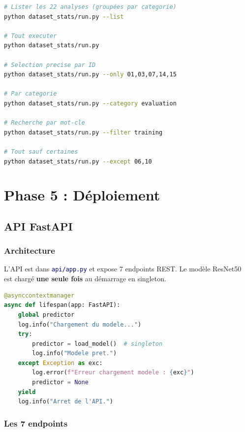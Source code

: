 \documentclass[11pt,a4paper,oneside]{report}
\newcommand{\code}[1]{\texttt{\textcolor{navy}{#1}}}
\begin{document}
\begin{lstlisting}[language=Bash, caption={Exemples d'utilisation}]
# Lister les 22 analyses (groupées par categorie)
python dataset_stats/run.py --list

# Tout executer
python dataset_stats/run.py

# Selection precise par ID
python dataset_stats/run.py --only 01,03,07,14,15

# Par categorie
python dataset_stats/run.py --category evaluation

# Recherche par mot-cle
python dataset_stats/run.py --filter training

# Tout sauf certaines
python dataset_stats/run.py --except 06,10
\end{lstlisting}

\chapter{Phase 5 : Déploiement}

\section{API FastAPI}

\subsection{Architecture}

L'API est dans \code{api/app.py} et expose 7 endpoints REST. Le modèle ResNet50 est chargé \textbf{une seule fois} au démarrage en singleton.

\begin{lstlisting}[language=Python, caption={Lifecycle de l'API}]
@asynccontextmanager
async def lifespan(app: FastAPI):
    global predictor
    log.info("Chargement du modele...")
    try:
        predictor = load_model()  # singleton
        log.info("Modele pret.")
    except Exception as exc:
        log.error(f"Erreur chargement modele : {exc}")
        predictor = None
    yield
    log.info("Arret de l'API.")
\end{lstlisting}

\subsection{Les 7 endpoints}
\end{document}
